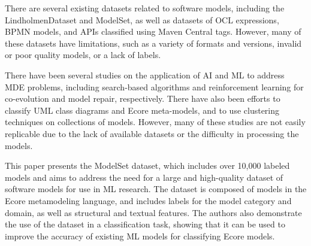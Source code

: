 There are several existing datasets related to software models, including the LindholmenDataset and ModelSet, as well as datasets of OCL expressions, BPMN models, and APIs classified using Maven Central tags. However, many of these datasets have limitations, such as a variety of formats and versions, invalid or poor quality models, or a lack of labels.

There have been several studies on the application of AI and ML to address MDE problems, including search-based algorithms and reinforcement learning for co-evolution and model repair, respectively. There have also been efforts to classify UML class diagrams and Ecore meta-models, and to use clustering techniques on collections of models. However, many of these studies are not easily replicable due to the lack of available datasets or the difficulty in processing the models.

This paper \cite{} presents the ModelSet dataset, which includes over 10,000 labeled models and aims to address the need for a large and high-quality dataset of software models for use in ML research. The dataset is composed of models in the Ecore metamodeling language, and includes labels for the model category and domain, as well as structural and textual features. The authors also demonstrate the use of the dataset in a classification task, showing that it can be used to improve the accuracy of existing ML models for classifying Ecore models.
